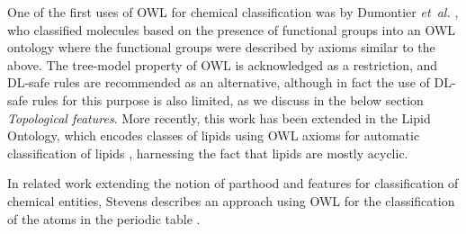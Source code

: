 \documentclass[10pt]{bmc_article}
\newenvironment{bmcformat}{\baselineskip20pt\sloppy\setboolean{publ}{false}}{\baselineskip20pt\sloppy}
\begin{document}
\begin{bmcformat}

One of the first uses of OWL for chemical classification was by Dumontier \emph{et~al.} \cite{dumontier2007}, who classified molecules based on the presence of functional groups into an OWL ontology where the functional groups were described by axioms similar to the above. The tree-model property of OWL is acknowledged as a restriction, and DL-safe rules \cite{dumontier2007} are recommended as an alternative, although in fact the use of DL-safe rules for this purpose is also limited, as we discuss in the below section \textit{Topological features}. More recently, this work has been extended in the Lipid Ontology, which encodes classes of lipids using OWL axioms for automatic classification of lipids \cite{chepelevlipids2011}, harnessing the fact that lipids are mostly acyclic. 
 
In related work extending the notion of parthood and features for classification of chemical entities, Stevens describes an approach using OWL for the classification of the atoms in the periodic table \cite{stevens2011}. 





\end{bmcformat}
\end{document}
